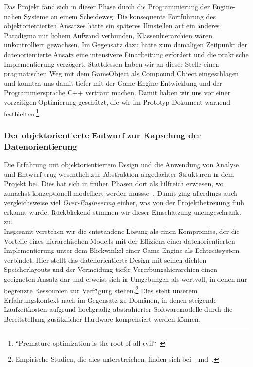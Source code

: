 Das Projekt fand sich in dieser Phase durch die Programmierung der Engine-nahen Systeme an einem Scheideweg.
Die konsequente Fortführung des objektorientierten Ansatzes hätte ein späteres Umstellen auf ein anderes Paradigma mit hohem Aufwand verbunden, Klassenhierarchien wären unkontrolliert gewachsen.
Im Gegensatz dazu hätte zum damaligen Zeitpunkt der datenorientierte Ansatz eine intensivere Einarbeitung erfordert und die praktische Implementierung verzögert.
Stattdessen haben wir an dieser Stelle einen pragmatischen Weg mit dem GameObject als Compound Object eingeschlagen und konnten uns damit tiefer mit der Game-Engine-Entwicklung und der Programmiersprache C++ vertraut machen.
Damit haben wir uns vor einer vorzeitigen Optimierung geschützt, die wir im Prototyp-Dokument warnend festhielten.\footnote{
    ``Premature optimization is the root of all evil``~\cite{Knu74}
}

\subsubsection{Der objektorientierte Entwurf zur Kapselung der Datenorientierung}

Die Erfahrung mit objektorientiertem Design und die Anwendung von Analyse und Entwurf trug wesentlich zur Abstraktion angedachter Strukturen in dem Projekt bei.
Dies hat sich in frühen Phasen dort als hilfreich erwiesen, wo zunächst konzeptionell modelliert werden musste~\cite{BMEY07}.
Damit ging allerdings auch vergleichsweise viel \textit{Over-Engineering} einher, was von der Projektbetreuung früh erkannt wurde.
Rückblickend stimmen wir dieser Einschätzung uneingeschränkt zu.\\

Insgesamt verstehen wir die entstandene Lösung als einen Kompromiss, der die Vorteile eines hierarchischen Modells mit der Effizienz einer datenorientierten Implementierung unter dem Blickwinkel einer Game Engine als Echtzeitsystem~\cite[S. 525]{Gre19} verbindet.
Hier stellt das datenorientierte Design mit seinen dichten Speicherlayouts und der Vermeidung tiefer Vererbungshierarchien einen geeigneten Ansatz dar und erweist sich in Umgebungen als wertvoll, in denen nur begrenzte Ressourcen zur Verfügung stehen.\footnote{
    Empirische Studien, die dies unterstreichen, finden sich bei~\cite{FAUM20} und~\cite{WWM22}.
}
Dies steht unserem Erfahrungskontext nach im Gegensatz zu Domänen, in denen steigende Laufzeitkosten aufgrund hochgradig abstrahierter Softwaremodelle durch die Bereitstellung zusätzlicher Hardware kompensiert werden können.\\

